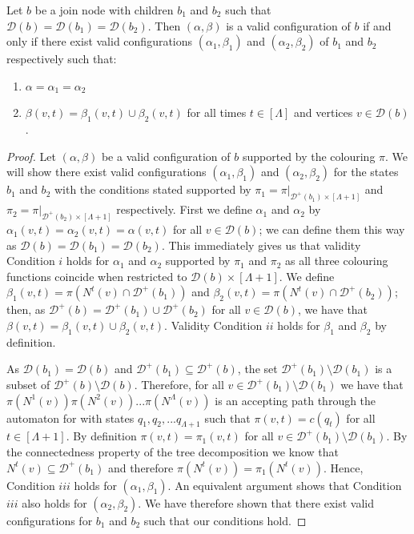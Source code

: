 \documentclass[runningheads]{llncs}
\begin{document}
\begin{lemmarep} \label{lem:join node}
    Let $b$ be a join node with children $b_1$ and $b_2$ such that $\mathcal{D}(b)=\mathcal{D}(b_1)=\mathcal{D}(b_2)$. Then $(\alpha,\beta)$ is a valid configuration of $b$ if and only if there exist valid configurations $(\alpha_1,\beta_1)$ and $(\alpha_2,\beta_2)$ of $b_1$ and $b_2$ respectively such that:
    \begin{enumerate}
        \item $\alpha=\alpha_1=\alpha_2$
        \item $\beta(v,t)=\beta_1(v,t) \cup \beta_2(v,t)$ for all times $t \in [\Lambda]$ and vertices $v\in \mathcal{D}(b)$.
    \end{enumerate}
\end{lemmarep}
\begin{proof}
  Let $(\alpha,\beta)$ be a valid configuration of $b$ supported by the colouring $\pi$. We will show there exist valid configurations $(\alpha_1,\beta_1)$ and $(\alpha_2,\beta_2)$ for the states $b_1$ and $b_2$ with the conditions stated supported by $\pi_1=\pi|_{\mathcal{D}^+(b_1) \times [\Lambda+1]}$ and $\pi_2=\pi|_{\mathcal{D}^+(b_2) \times [\Lambda+1]}$ respectively.
First we define $\alpha_1$ and $\alpha_2$ by $\alpha_1(v,t)=\alpha_2(v,t)=\alpha(v,t)$ for all $v \in \mathcal{D}(b)$; we can define them this way as $\mathcal{D}(b)=\mathcal{D}(b_1)=\mathcal{D}(b_2)$. This immediately gives us that validity Condition $i$ holds for $\alpha_1$ and $\alpha_2$ supported by $\pi_1$ and $\pi_2$ as all three colouring functions coincide when restricted to $\mathcal{D}(b)\times[\Lambda+1]$.
We define $\beta_1(v,t)=\pi(N^t(v) \cap \mathcal{D}^+(b_1))$ and $\beta_2(v,t)=\pi(N^t(v) \cap \mathcal{D}^+(b_2))$; then, as $\mathcal{D}^+(b)=\mathcal{D}^+(b_1)\cup\mathcal{D}^+(b_2)$ for all $v \in \mathcal{D}(b)$, we have that $\beta(v,t)=\beta_1(v,t) \cup \beta_2(v,t)$.
Validity Condition $ii$ holds for $\beta_1$ and $\beta_2$ by definition.

As $\mathcal{D}(b_1)=\mathcal{D}(b)$ and $\mathcal{D}^+(b_1) \subseteq \mathcal{D}^+(b)$, the set $\mathcal{D}^+(b_1) \setminus \mathcal{D}(b_1)$ is a subset of $\mathcal{D}^+(b) \setminus \mathcal{D}(b)$.
Therefore, for all $v \in \mathcal{D}^+(b_1) \setminus \mathcal{D}(b_1)$ we have that  $ \pi(N^1(v))\pi(N^2(v))...\pi(N^\Lambda(v))$ is an accepting path through the automaton for with states $q_1,q_2,...q_{\Lambda+1}$ such that $\pi(v,t)=c(q_t)$ for all $t \in [\Lambda+1]$. By definition $\pi(v,t)=\pi_1(v,t)$ for all $v \in \mathcal{D}^+(b_1) \setminus \mathcal{D}(b_1)$. By the connectedness property of the tree decomposition we know that $N^t(v) \subseteq \mathcal{D}^+(b_1)$ and therefore $\pi(N^t(v))=\pi_1(N^t(v))$. Hence, Condition $iii$ holds for $(\alpha_1,\beta_1)$.
An equivalent argument shows that Condition $iii$ also holds for $(\alpha_2,\beta_2)$. 
We have therefore shown that there exist valid configurations for $b_1$ and $b_2$ such that our conditions hold.


\end{proof}
\end{document}
